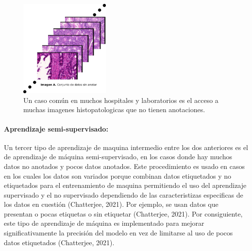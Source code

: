 \documentclass[12pt,letterpaper,final, openany]{scrbook}
\begin{document}
\begin{figure}[h!]
    \centering
    \includegraphics[width=0.4\textwidth]{unlabelled.png}
    \caption{Un caso común en muchos hospitales y laboratorios es el acceso a muchas imagenes histopatologicas que no tienen anotaciones.}
    \label{fig:unlabelled}
\end{figure}


\paragraph{Aprendizaje semi-supervisado:}

Un tercer tipo de aprendizaje de maquina intermedio entre los dos anteriores es el de aprendizaje de máquina semi-supervisado, en los casos donde hay muchos datos no anotados y pocos datos anotados. Este procedimiento es usado en casos en los cuales los datos son variados porque combinan datos etiquetados y no etiquetados para el entrenamiento de maquina permitiendo el uso del aprendizaje supervisado y el no supervisado dependiendo de las caracteristizas especificas de los datos en cuestión (Chatterjee, 2021). Por ejemplo, se usan datos que presentan o pocas etiquetas o sin etiquetar (Chatterjee, 2021). Por consiguiente, este tipo de aprendizaje de máquina es implementado para mejorar significativamente la precisión del modelo en vez de limitarse al uso de pocos datos etiquetados (Chatterjee, 2021).
\end{document}
